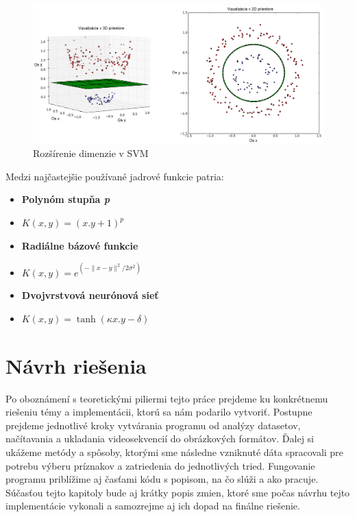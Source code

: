 \begin{figure}[H]
  \centering
  \includegraphics[width=16cm]{img/SVM.png}
  \caption{Rozšírenie dimenzie v SVM}
  \label{SVMobr}
\end{figure}

Medzi najčastejšie používané jadrové funkcie patria:

\begin{itemize}
\item \textbf{Polynóm stupňa \textit{p}}
\item $  K(x,y) = (x.y + 1)^p $
\item \textbf{Radiálne bázové funkcie}
\item $   K(x,y) = e^{(-\|x-y\|^2/2\sigma^2)}  $
\item \textbf{Dvojvrstvová neurónová sieť }
\item $   K(x,y) = \tanh(\kappa x.y - \delta)  $
\end{itemize}



\newpage

\section{Návrh riešenia}
Po oboznámení s teoretickými piliermi tejto práce prejdeme ku konkrétnemu riešeniu témy a implementácii, ktorú sa nám podarilo vytvoriť. Postupne prejdeme jednotlivé kroky vytvárania programu od analýzy datasetov, načítavania a ukladania videosekvencií do obrázkových formátov. Ďalej si ukážeme metódy a spôsoby, ktorými sme následne vzniknuté dáta spracovali pre potrebu výberu príznakov a zatriedenia do jednotlivých tried. Fungovanie programu priblížime aj časťami kódu s popisom, na čo slúži a ako pracuje. Súčasťou tejto kapitoly bude aj krátky popis zmien, ktoré sme počas návrhu tejto implementácie vykonali a samozrejme aj ich dopad na finálne riešenie.

